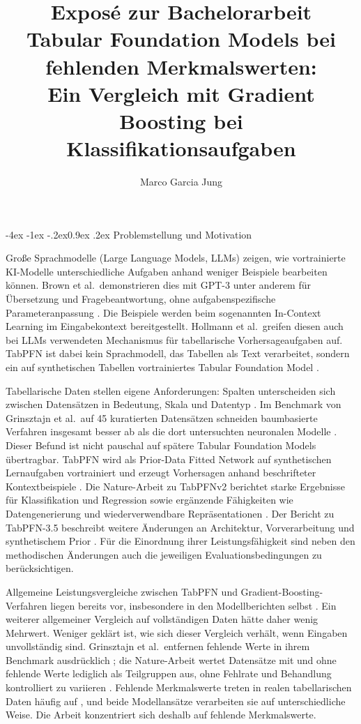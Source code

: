 \documentclass[12pt,a4paper]{article}
\title{Exposé zur Bachelorarbeit\\[0.5em]
\large Tabular Foundation Models bei fehlenden Merkmalswerten:\\
Ein Vergleich mit Gradient Boosting bei Klassifikationsaufgaben}
\author{Marco Garcia Jung}
\date{}
\makeatletter
\renewcommand\section{\@startsection{section}{1}{\z@}%
  {-4ex \@plus -1ex \@minus -.2ex}{0.9ex \@plus .2ex}%
  {\normalfont\Large\bfseries}}
\makeatother
\begin{document}
\maketitle

\section{Problemstellung und Motivation}

Große Sprachmodelle (Large Language Models, LLMs) zeigen, wie vortrainierte
KI-Modelle unterschiedliche Aufgaben anhand weniger Beispiele bearbeiten
können. Brown et al.\ demonstrieren dies mit GPT-3 unter anderem für
Übersetzung und Fragebeantwortung, ohne aufgabenspezifische
Parameteranpassung \cite{brown_language_2020}.
Die Beispiele werden beim sogenannten In-Context Learning im
Eingabekontext bereitgestellt.
Hollmann et al.\ greifen diesen auch bei LLMs verwendeten Mechanismus für
tabellarische Vorhersageaufgaben auf. TabPFN ist dabei kein Sprachmodell,
das Tabellen als Text verarbeitet, sondern ein auf synthetischen Tabellen
vortrainiertes Tabular Foundation Model
\cite[S.~319--320]{hollmann_accurate_2025}.

Tabellarische Daten stellen eigene Anforderungen: Spalten unterscheiden
sich zwischen Datensätzen in Bedeutung, Skala und Datentyp
\cite[S.~319]{hollmann_accurate_2025}. Im Benchmark von Grinsztajn et al.\
auf 45 kuratierten Datensätzen schneiden baumbasierte Verfahren insgesamt
besser ab als die dort untersuchten neuronalen Modelle
\cite{grinsztajn_why_2022}. Dieser Befund ist nicht pauschal auf spätere
Tabular Foundation Models übertragbar. TabPFN wird als Prior-Data Fitted
Network auf synthetischen Lernaufgaben vortrainiert und erzeugt
Vorhersagen anhand beschrifteter Kontextbeispiele
\cite{muller_transformers_2024,hollmann_tabpfn_2023}.
Die Nature-Arbeit zu TabPFNv2 berichtet starke Ergebnisse für
Klassifikation und Regression sowie ergänzende Fähigkeiten wie
Datengenerierung und wiederverwendbare Repräsentationen
\cite{hollmann_accurate_2025}. Der Bericht zu TabPFN-3.5 beschreibt weitere
Änderungen an Architektur, Vorverarbeitung und synthetischem Prior
\cite[Abschnitt 3]{jager_tabpfn-35_2026}.
Für die Einordnung ihrer Leistungsfähigkeit sind neben den methodischen
Änderungen auch die jeweiligen Evaluationsbedingungen zu berücksichtigen.

Allgemeine Leistungsvergleiche zwischen TabPFN und
Gradient-Boosting-Verfahren liegen bereits vor, insbesondere in den
Modellberichten selbst \cite{hollmann_accurate_2025,grinsztajn_tabpfn-25_2026}.
Ein weiterer allgemeiner Vergleich auf vollständigen Daten hätte daher
wenig Mehrwert. Weniger geklärt ist, wie sich dieser Vergleich verhält,
wenn Eingaben unvollständig sind. Grinsztajn et al.\ entfernen fehlende
Werte in ihrem Benchmark ausdrücklich
\cite[Abschnitt 3.2]{grinsztajn_why_2022}; die Nature-Arbeit wertet
Datensätze mit und ohne fehlende Werte lediglich als Teilgruppen aus,
ohne Fehlrate und Behandlung kontrolliert zu variieren
\cite[Abb.~5b]{hollmann_accurate_2025}. Fehlende Merkmalswerte treten in
realen tabellarischen Daten häufig auf \cite{perez_benchmarking_2022},
und beide Modellansätze verarbeiten sie auf unterschiedliche Weise.
Die Arbeit konzentriert sich deshalb auf fehlende Merkmalswerte.
\end{document}
